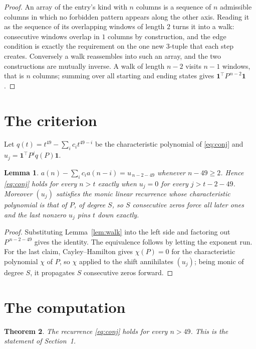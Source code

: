 \documentclass[11pt,a4paper]{article}
\theoremstyle{plain}
\newtheorem{theorem}{Theorem}
\newtheorem{lemma}[theorem]{Lemma}
\theoremstyle{definition}
\begin{document}
\begin{proof}
An array of the entry's kind with $n$ columns is a sequence of $n$ admissible columns in
which no forbidden pattern appears along the other axis. Reading it as the sequence of its
overlapping windows of length $2$ turns it into a walk: consecutive windows overlap in
$1$ columns by construction, and the edge condition is exactly the requirement on the one
new $3$-tuple that each step creates. Conversely a walk reassembles into such an array,
and the two constructions are mutually inverse. A walk of length $n-2$ visits $n-1$
windows, that is $n$ columns; summing over all starting and ending states gives
$\mathbf{1}^{\!\top}P^{\,n-2}\mathbf{1}$.
\end{proof}

\section{The criterion}

Let $q(t)=t^{49}-\sum_i c_i t^{49-i}$ be the characteristic polynomial of
\eqref{eq:conj} and $u_j=\mathbf{1}^{\!\top}P^{j}q(P)\mathbf{1}$.

\begin{lemma}\label{lem:crit}
$a(n)-\sum_i c_i a(n-i)=u_{\,n-2-49}$ whenever $n-49\ge2$. Hence
\eqref{eq:conj} holds for every $n>t$ exactly when $u_j=0$ for every
$j>t-2-49$. Moreover $(u_j)$ satisfies the monic linear recurrence whose
characteristic polynomial is that of $P$, of degree $S$, so $S$ consecutive zeros force all
later ones and the last nonzero $u_j$ pins $t$ down exactly.
\end{lemma}

\begin{proof}
Substituting Lemma~\ref{lem:walk} into the left side and factoring out
$P^{\,n-2-49}$ gives the identity. The equivalence follows by letting the exponent
run. For the last claim, Cayley--Hamilton gives $\chi(P)=0$ for the characteristic
polynomial $\chi$ of $P$, so $\chi$ applied to the shift annihilates $(u_j)$; being monic of
degree $S$, it propagates $S$ consecutive zeros forward.
\end{proof}

\section{The computation}

\begin{theorem}
The recurrence \eqref{eq:conj} holds for every $n>49$. This is the statement of
Section~1.
\end{theorem}
\end{document}
